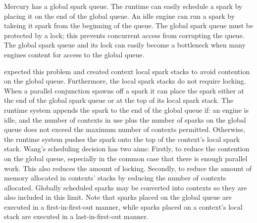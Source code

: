 
Mercury has a global spark queue.
The runtime can easily schedule a spark by placing it on the end of the
global queue.
An idle engine can run a spark by takeing it spark from the beginning of the queue.
The global spark queue must be protected by a lock;
this prevents concurrent access from corrupting the queue.
The global spark queue and its lock can easily become a bottleneck when many
engines content for access to the global queue.

\citet{wang-hons} expected this problem and created context local spark stacks
to avoid contention on the global queue.
Furthermore, the local spark stacks do not require locking.
When a parallel conjunction spawns off a spark it can place the spark either
at the end of the global spark queue or at the top of its local spark stack.
The runtime system appends the spark to the end of the global queue if:
an engine is idle, and
the number of contexts in use plus the number of sparks on the global queue
does not exceed the maximum number of contexts permitted.
Otherwise,
the runtime system pushes the spark onto the top of the context's local
spark stack.
Wang's scheduling decision has two aims:
Firstly, to reduce the contention on the global queue,
especially in the common case that there is enough parallel work.
This also reduces the amount of locking.
Secondly, to reduce the amount of memory allocated
in contexts' stacks by reducing the number of contexts allocated.
Globally scheduled sparks may be converted into contexts so they are also
included in this limit.
Note that sparks placed on the global queue are executed in a
first-in-first-out manner, while
sparks placed on a context's local stack are executed in a
last-in-first-out manner.

